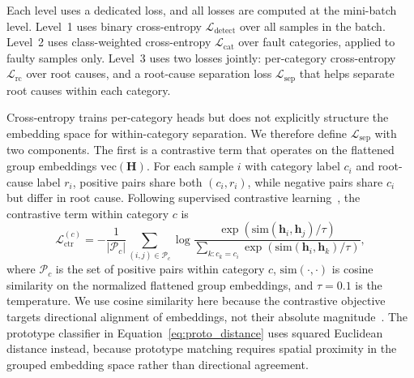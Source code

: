 Each level uses a dedicated loss, and all losses are computed at the mini-batch level. Level~1 uses binary cross-entropy $\mathcal{L}_{\text{detect}}$ over all samples in the batch. Level~2 uses class-weighted cross-entropy $\mathcal{L}_{\text{cat}}$ over fault categories, applied to faulty samples only. Level~3 uses two losses jointly: per-category cross-entropy $\mathcal{L}_{\text{rc}}$ over root causes, and a root-cause separation loss $\mathcal{L}_{\text{sep}}$ that helps separate root causes within each category.

Cross-entropy trains per-category heads but does not explicitly structure the embedding space for within-category separation. We therefore define $\mathcal{L}_{\text{sep}}$ with two components. The first is a contrastive term that operates on the flattened group embeddings $\text{vec}(\mathbf{H})$. For each sample $i$ with category label $c_i$ and root-cause label $r_i$, positive pairs share both $(c_i, r_i)$, while negative pairs share $c_i$ but differ in root cause. Following supervised contrastive learning~\cite{khosla2020supervised}, the contrastive term within category $c$ is
\begin{equation}
\mathcal{L}_{\text{ctr}}^{(c)} = -\frac{1}{|\mathcal{P}_c|} \sum_{(i,j) \in \mathcal{P}_c} \log \frac{\exp(\text{sim}(\mathbf{h}_i, \mathbf{h}_j) / \tau)}{\sum_{k : c_k = c_i} \exp(\text{sim}(\mathbf{h}_i, \mathbf{h}_k) / \tau)},
\label{eq:contrastive}
\end{equation}
where $\mathcal{P}_c$ is the set of positive pairs within category $c$, $\text{sim}(\cdot, \cdot)$ is cosine similarity on the normalized flattened group embeddings, and $\tau = 0.1$ is the temperature. We use cosine similarity here because the contrastive objective targets directional alignment of embeddings, not their absolute magnitude~\cite{wang2021understanding,islam2023self}. The prototype classifier in Equation~\ref{eq:proto_distance} uses squared Euclidean distance instead, because prototype matching requires spatial proximity in the grouped embedding space rather than directional agreement.

